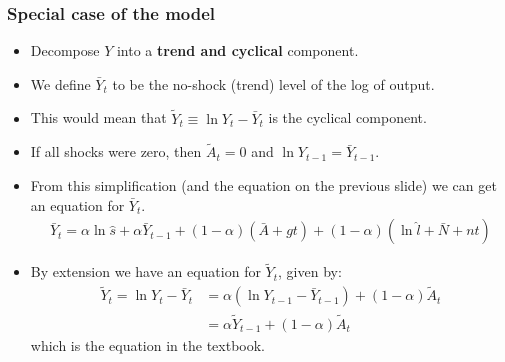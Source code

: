 \documentclass[10pt, handout]{beamer} %
\begin{document}
\begin{frame}
\frametitle{Special case of the model}
\begin{itemize}[<+->]
\item Decompose $Y$ into a \textbf{trend and cyclical} component.
\item We define $\bar{Y}_{t}$ to be the no-shock (trend) level of the log of output.
\item This would mean that $\tilde{Y}_{t} \equiv \ln{Y_{t}} - \bar{Y}_{t}$ is the cyclical component.
\item If all shocks were zero, then $\tilde{A}_{t} = 0$ and $\ln{Y_{t-1}} = \bar{Y}_{t-1}$.
\vspace{3mm}
\item From this simplification (and the equation on the previous slide) we can get an equation for $\bar{Y}_{t}$.
\begin{align*}
\bar{Y}_{t} = \alpha\ln{\hat{s}} + \alpha\bar{Y}_{t-1} + (1-\alpha)(\bar{A} + gt) + (1-\alpha)(\ln{\hat{l}} +  \bar{N} + nt)
\end{align*}
\item By extension we have an equation for $\tilde{Y}_{t}$, given by:
\begin{align*}
\tilde{Y}_{t} = \ln{Y_{t}} - \bar{Y}_{t} &= \alpha(\ln{Y_{t-1}} - \bar{Y}_{t-1}) + (1-\alpha)\tilde{A}_{t}  \\
&= \alpha\tilde{Y}_{t-1} + (1-\alpha)\tilde{A}_{t}
\end{align*}
which is the equation in the textbook.
\end{itemize}
\end{frame}
\end{document}
